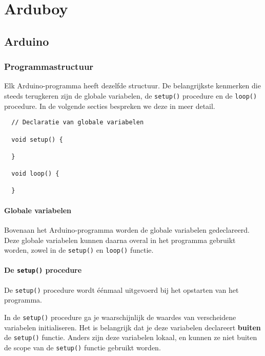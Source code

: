 \documentclass[11pt,fleqn]{book} %
\begin{document}
\part{Arduboy}

\chapter{Arduino}
\section{Programmastructuur}
Elk Arduino-programma heeft dezelfde structuur. De belangrijkste kenmerken die steeds terugkeren zijn de globale variabelen, de \texttt{setup()} procedure en de \texttt{loop()} procedure. In de volgende secties bespreken we deze in meer detail.

\begin{definition}
	\phantom{}
	\begin{verbatim}
  // Declaratie van globale variabelen
  
  void setup() {
    
  }
  
  void loop() {
  
  }
	\end{verbatim}
	\vspace{0cm}
\end{definition}

\subsection{Globale variabelen}
Bovenaan het Arduino-programma worden de globale variabelen gedeclareerd. Deze globale variabelen kunnen daarna overal in het programma gebruikt worden, zowel in de \texttt{setup()} en \texttt{loop()} functie.

\subsection{De \texttt{setup()} procedure}
De \texttt{setup()} procedure wordt éénmaal uitgevoerd bij het opstarten van het programma.

\begin{remark}
	In de \texttt{setup()} procedure ga je waarschijnlijk de waardes van verscheidene variabelen initialiseren. Het is belangrijk dat je deze variabelen declareert \textbf{buiten} de \texttt{setup()} functie. Anders zijn deze variabelen lokaal, en kunnen ze niet buiten de scope van de \texttt{setup()} functie gebruikt worden.
\end{remark}
\end{document}
